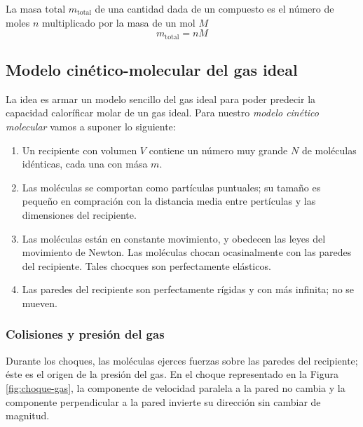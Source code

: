 \documentclass[12pt]{article}
\begin{document}
  La masa total $ m_{\text{total}} $ de una cantidad dada de un compuesto es el número de moles $ n $ multiplicado por la masa de un mol $ M $
  \[
  m_{\text{total}} = nM
  \]
  
  \subsection{Modelo cinético-molecular del gas ideal}
  La idea es armar un modelo sencillo del gas ideal para poder predecir la capacidad caloríficar molar de un gas ideal.
  Para nuestro \textit{modelo cinético molecular} vamos a suponer lo siguiente:
  \begin{enumerate}[1.]
    \item Un recipiente con volumen $ V $ contiene un número muy grande $ N $ de moléculas idénticas, cada una con mása $ m $.

    \item Las moléculas se comportan como partículas puntuales; su tamaño es pequeño en compración con la distancia media entre pertículas y las dimensiones del recipiente.

    \item Las moléculas están en constante movimiento, y obedecen las leyes del movimiento de Newton. Las  moléculas chocan ocasinalmente con las paredes del recipiente. Tales chocques son perfectamente elásticos.

    \item Las paredes del recipiente son perfectamente rígidas y con más infinita; no se mueven.
  \end{enumerate}

  \subsubsection{Colisiones y presión del gas}
  Durante los choques, las moléculas ejerces fuerzas sobre las paredes del recipiente; éste es el origen de la presión del gas. En el choque representado en la Figura \ref{fig:choque-gas}, la componente de velocidad paralela a la pared no cambia y la componente perpendicular a la pared invierte su dirección sin cambiar de magnitud.
\end{document}
